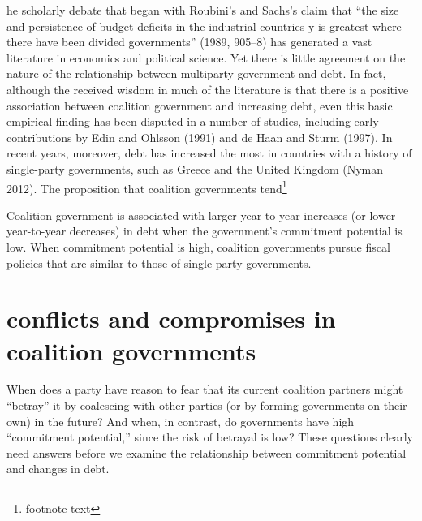 \documentclass{cup_PSRM}
\begin{document}
he scholarly debate that began with Roubini's and Sachs's claim that ``the size and
persistence of budget deficits in the industrial countries y is greatest where there have
been divided governments'' (1989, 905--8) has generated a vast literature in economics and
political science. Yet there is little agreement on the nature of the relationship between
multiparty government and debt. In fact, although the received wisdom in much of the
literature is that there is a positive association between coalition government and
increasing debt, even this basic
empirical finding has been disputed in a number of studies, including early contributions
by Edin and Ohlsson (1991) and de Haan and Sturm (1997). In recent years, moreover,
debt has increased the most in countries with a history of single-party governments, such
as Greece and the United Kingdom (Nyman 2012).
The proposition that coalition governments tend\footnote{footnote text}

\begin{hypolist}
\item Coalition government is associated with larger year-to-year increases (or
lower year-to-year decreases) in debt when the government's
commitment potential is low. When commitment potential is high,
coalition governments pursue fiscal policies that are similar to
those of single-party governments.
\end{hypolist}

\section{conflicts and compromises in coalition governments}

When does a party have reason to fear that its current coalition partners might ``betray'' it
by coalescing with other parties (or by forming governments on their own) in the future?
And when, in contrast, do governments have high ``commitment potential,'' since the risk
of betrayal is low? These questions clearly need answers before we examine the
relationship between commitment potential and changes in debt.
\end{document}
